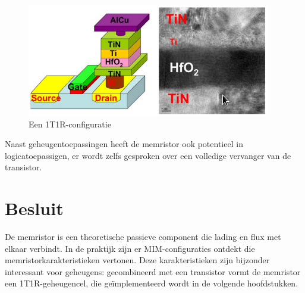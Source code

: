 \begin{figure}
  \centering
  \includegraphics[scale=0.6]{../fig/hfdstk-cel-1T1R.png}
  \caption{Een 1T1R-configuratie\cite{Won12}}
  \label{fig:1T1R}
\end{figure}

Naast geheugentoepassingen heeft de memristor ook potentieel in logicatoepassigen, er wordt zelfs gesproken over een volledige vervanger van de transistor\cite{Kue05}.


\section{Besluit}
De memristor is een theoretische passieve component die lading en flux met elkaar verbindt. In de praktijk zijn er MIM-configuraties ontdekt die memristorkarakteristieken vertonen. Deze karakteristieken zijn bijzonder interessant voor geheugens: gecombineerd met een transistor vormt de memristor een 1T1R-geheugencel, die geïmplementeerd wordt in de volgende hoofdstukken.
